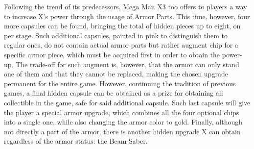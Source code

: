 Following the trend of its predecessors, Mega Man X3 too offers to players a way to increase X's power through the usage of Armor Parts. This time, however, four more capsules can be found, bringing the total of hidden pieces up to eight, on per stage. Such additional capsules, painted in pink to distinguish them to regular ones, do not contain actual armor parts but rather augment chip for a specific armor piece, which must be acquired first in order to obtain the power-up. The trade-off for such augment is, however, that the armor can only stand one of them and that they cannot be replaced, making the chosen upgrade permanent for the entire game. However, continuing the tradition of previous games, a final hidden capsule can be obtained as a prize for obtaining all collectible in the game, safe for said additional capsule. Such last capsule will give the player a special armor upgrade, which combines all the four optional chips into a single one, while also changing the armor color to gold. Finally, although not directly a part of the armor, there is another hidden upgrade X can obtain regardless of the armor status: the Beam-Saber.

